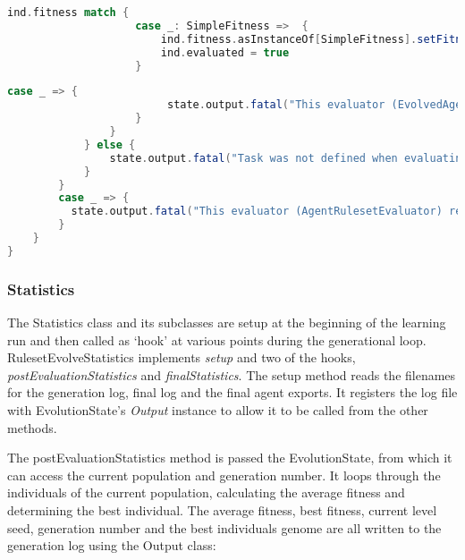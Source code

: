 \begin{minipage}{0.9\linewidth}
\centering
\begin{lstlisting}[language=scala]
                ind.fitness match {
                    case _: SimpleFitness =>  {
                        ind.fitness.asInstanceOf[SimpleFitness].setFitness(state, iFitness.toDouble, false)
                        ind.evaluated = true
                    }
\end{lstlisting}
\end{minipage}

\begin{minipage}{0.9\linewidth}
\centering
\begin{lstlisting}[language=scala]
                    case _ => {
                         state.output.fatal("This evaluator (EvolvedAgentRulesetEvaluator) requires a individuals to have SimpleFitness")
                    }
                }
            } else {
                state.output.fatal("Task was not defined when evaluating individual, implying prepareToEvaluate was not run on this instance.")
            }
        }
        case _ => {
          state.output.fatal("This evaluator (AgentRulesetEvaluator) requires a ByteVectorIndividual")
        }
    }
}

\end{lstlisting}
\end{minipage}

\subsubsection{Statistics}

The Statistics class and its subclasses are setup at the beginning of the learning run and then called as `hook' at various points during the generational loop. RulesetEvolveStatistics implements \emph{setup} and two of the hooks, \emph{postEvaluationStatistics} and \emph{finalStatistics}. The setup method reads the filenames for the generation log, final log and the final agent exports. It registers the log file with EvolutionState's \emph{Output} instance to allow it to be called from the other methods. 

The postEvaluationStatistics method is passed the EvolutionState, from which it can access the current population and generation number. It loops through the individuals of the current population, calculating the average fitness and determining the best individual. The average fitness, best fitness, current level seed, generation number and the best individuals genome are all written to the generation log using the Output class:

